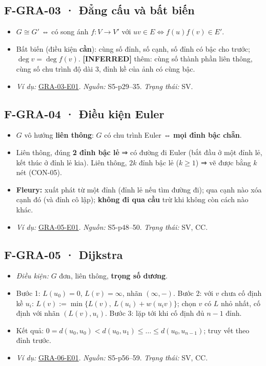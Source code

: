 \documentclass[
  10pt,
  twoside,openany]{book}
\providecommand{\tightlist}{%
  \setlength{\itemsep}{0pt}\setlength{\parskip}{0pt}}
\begin{document}
\hypertarget{F-GRA-03}{%
\subsection{F-GRA-03 · Đẳng cấu và bất biến}\label{F-GRA-03}}

\begin{itemize}
\tightlist
\item
  \(G\cong G'\) ⇔ có song ánh \(f:V\to V'\) với
  \(uv\in E\Leftrightarrow f(u)f(v)\in E'\).
\item
  Bất biến (điều kiện \textbf{cần}): cùng số đỉnh, số cạnh, số đỉnh có
  bậc cho trước; \(\deg v=\deg f(v)\). \textbf{{[}INFERRED{]}} thêm:
  cùng số thành phần liên thông, cùng số chu trình độ dài 3, đỉnh kề của
  ảnh có cùng bậc.
\item
  \emph{Ví dụ:} \protect\hyperlink{GRA-03-E01}{GRA-03-E01}.
  \emph{Nguồn:} S5-p29--35. \emph{Trạng thái:} SV.
\end{itemize}

\hypertarget{F-GRA-04}{%
\subsection{F-GRA-04 · Điều kiện Euler}\label{F-GRA-04}}

\begin{itemize}
\tightlist
\item
  \(G\) vô hướng \textbf{liên thông}: \(G\) có chu trình Euler ⇔
  \textbf{mọi đỉnh bậc chẵn}.
\item
  Liên thông, đúng \textbf{2 đỉnh bậc lẻ} ⇒ có đường đi Euler (bắt đầu ở
  một đỉnh lẻ, kết thúc ở đỉnh lẻ kia). Liên thông, \(2k\) đỉnh bậc lẻ
  (\(k\ge1\)) ⇒ vẽ được bằng \(k\) nét (CON-05).
\item
  \textbf{Fleury:} xuất phát từ một đỉnh (đỉnh lẻ nếu tìm đường đi); qua
  cạnh nào xóa cạnh đó (và đỉnh cô lập); \textbf{không đi qua cầu} trừ
  khi không còn cách nào khác.
\item
  \emph{Ví dụ:} \protect\hyperlink{GRA-05-E01}{GRA-05-E01}.
  \emph{Nguồn:} S5-p48--50. \emph{Trạng thái:} SV, CC.
\end{itemize}

\hypertarget{F-GRA-05}{%
\subsection{F-GRA-05 · Dijkstra}\label{F-GRA-05}}

\begin{itemize}
\tightlist
\item
  \emph{Điều kiện:} \(G\) đơn, liên thông, \textbf{trọng số dương}.
\item
  Bước 1: \(L(u_0)=0\), \(L(v)=\infty\), nhãn \((\infty,-)\). Bước 2:
  với \(v\) chưa cố định kề \(u_i\):
  \(L(v):=\min\{L(v),\ L(u_i)+w(u_iv)\}\); chọn \(v\) có \(L\) nhỏ nhất,
  cố định với nhãn \((L(v),u_i)\). Bước 3: lặp tới khi cố định đủ
  \(n-1\) đỉnh.
\item
  Kết quả: \(0=d(u_0,u_0)<d(u_0,u_1)\le\dots\le d(u_0,u_{n-1})\); truy
  vết theo đỉnh trước.
\item
  \emph{Ví dụ:} \protect\hyperlink{GRA-06-E01}{GRA-06-E01}.
  \emph{Nguồn:} S5-p56--59. \emph{Trạng thái:} SV, CC.
\end{itemize}
\end{document}
